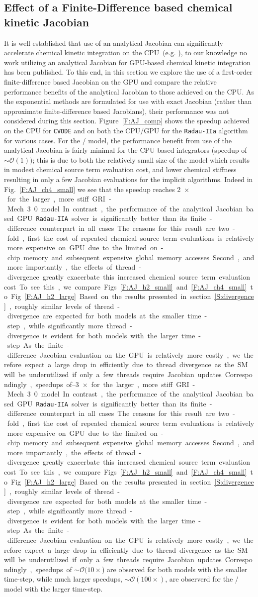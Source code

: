 \documentclass[final,twocolumn]{elsarticle}
\begin{document}
\subsection{Effect of a Finite-Difference based chemical kinetic Jacobian}
It is well established that use of an analytical Jacobian can significantly accelerate chemical kinetic integration on the CPU~(e.g. \cite{Lu:2009gh,stone2014comparison}), to our knowledge no work utilizing an analytical Jacobian for GPU-based chemical kinetic integration has been published.
To this end, in this section we explore the use of a first-order finite-difference based Jacobian on the GPU and compare the relative performance benefits of the analytical Jacobian to those achieved on the CPU.
As the exponential methods are formulated for use with exact Jacobian (rather than approximate finite-difference based Jacobians), their performance was not considered during this section.
Figure~\ref{F:AJ_comp} shows the speedup achieved on the CPU for \texttt{CVODE} and on both the CPU\slash GPU for the \texttt{Radau-IIa} algorithm for various cases.
For the \slash{} model, the performance benefit from use of the analytical Jacobian is fairly minimal for the CPU based integrators (speedup of $\sim\mathcal{O}(1))$; this is due to both the relatively small size of the model which results in modest chemical source term evaluation cost, and lower chemical stiffness resulting in only a few Jacobian evaluations for the implicit algorithms.
Indeed in Fig.~\ref{F:AJ_ch4_small} we see that the speedup reaches \SIrange{2}{3}{$\times$} for the larger, more stiff GRI-Mech 3.0 model.
In contrast, the performance of the analytical Jacobian based GPU \texttt{Radau-IIA} solver is significantly better than its finite-difference counterpart in all cases.
The reasons for this result are two-fold, first the cost of repeated chemical source term evaluations is relatively more expensive on GPU due to the limited on-chip memory and subsequent expensive global memory accesses.
Second, and more importantly, the effects of thread-divergence greatly exacerbate this increased chemical source term evaluation cost.
To see this, we compare Figs~\ref{F:AJ_h2_small} and \ref{F:AJ_ch4_small} to Fig.~\ref{F:AJ_h2_large}.
Based on the results presented in section~\ref{S:divergence}, roughly similar levels of thread-divergence are expected for both models at the smaller time-step, while significantly more thread-divergence is evident for both models with the larger time-step.
As the finite-difference Jacobian evaluation on the GPU is relatively more costly, we therefore expect a large drop in efficiently due to thread divergence as the SM will be underutilized if only a few threads require Jacobian updates.
Correspondingly, speedups of $\sim\mathcal{O}(10\times$) are observed for both models with the smaller time-step, while much larger speedups, $\sim\mathcal{O}(100\times)$, are observerd for the \slash{} model with the larger time-step.
\end{document}
